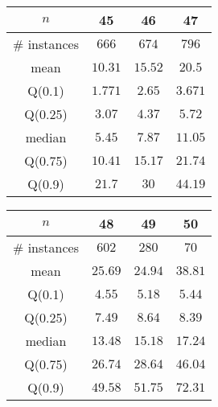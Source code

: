 \begin{tabular}{c|ccc} 
\hline 
$n$ & 45 & 46 & 47 \tabularnewline 
\hline 
\hline 
\# instances & $666$ & $674$ & $796$ \tabularnewline 
mean & $10.31$ & $15.52$ & $20.5$ \tabularnewline 
Q(0.1) & $1.771$ & $2.65$ & $3.671$ \tabularnewline 
Q(0.25) & $3.07$ & $4.37$ & $5.72$ \tabularnewline 
median & $5.45$ & $7.87$ & $11.05$ \tabularnewline 
Q(0.75) & $10.41$ & $15.17$ & $21.74$ \tabularnewline 
Q(0.9) & $21.7$ & $30$ & $44.19$ \tabularnewline 
\hline 
\end{tabular} 
\medskip{} 

\begin{tabular}{c|ccc} 
\hline 
$n$ & 48 & 49 & 50 \tabularnewline 
\hline 
\hline 
\# instances & $602$ & $280$ & $70$ \tabularnewline 
mean & $25.69$ & $24.94$ & $38.81$ \tabularnewline 
Q(0.1) & $4.55$ & $5.18$ & $5.44$ \tabularnewline 
Q(0.25) & $7.49$ & $8.64$ & $8.39$ \tabularnewline 
median & $13.48$ & $15.18$ & $17.24$ \tabularnewline 
Q(0.75) & $26.74$ & $28.64$ & $46.04$ \tabularnewline 
Q(0.9) & $49.58$ & $51.75$ & $72.31$ \tabularnewline 
\hline 
\end{tabular} 
\medskip{} 

